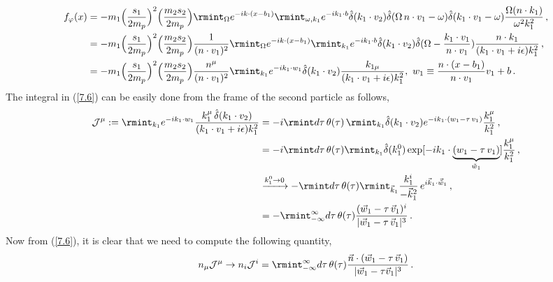 \begin{align}
\begin{split}
      f_{\varphi}(x)&= -m_1\Big(\frac{s_1}{2m_p}\Big)^2 \Big(\frac{m_2s_2}{2m_p}\Big)\rmint_{\Omega}e^{-ik\cdot (x-b_1)}\rmint_{\omega,k_1}e^{-i k_1\cdot b}\hat{\delta}(k_1\cdot v_2)\hat{\delta}(\Omega\, n\cdot v_1-\omega)\hat\delta(k_1\cdot v_1-\omega)\frac{\Omega(n\cdot k_1)}{\omega^2 k_1^2}\,,\\ &
       = -m_1\Big(\frac{s_1}{2m_p}\Big)^2 \Big(\frac{m_2s_2}{2m_p}\Big)\frac{1}{(n\cdot v_1)^2}\rmint_{\Omega}e^{-ik\cdot (x-b_1)}\rmint_{k_1}e^{-ik_1\cdot b}\hat\delta(k_1\cdot v_2)\hat{\delta}(\Omega-\frac{k_1\cdot v_1}{n\cdot v_1})\frac{n\cdot k_1}{(k_1\cdot v_1+i\epsilon)k_1^2}\,,\\ &
     = -m_1\Big(\frac{s_1}{2m_p}\Big)^2 \Big(\frac{m_2s_2}{2m_p}\Big)\frac{n^{\mu}}{(n\cdot v_1)^2}\rmint_{k_1}e^{-i k_1\cdot w_1}\hat{\delta}(k_1\cdot v_2)\frac{k_{1\mu}}{(k_1\cdot v_1+i\epsilon)k_1^2},\,\, w_1\equiv\frac{n\cdot (x-b_1)}{n\cdot v_1}v_1+b \,.\label{7.6}
      \end{split}
\end{align}
The integral in (\ref{7.6}) can be easily done from the frame of the second particle as follows,
\begin{align}
    \begin{split}
        \mathcal{J}^{\mu}:=\rmint_{k_1}e^{-i k_1\cdot w_1}\frac{k_1^{\mu}\,\hat\delta(k_1\cdot v_2)}{(k_1\cdot v_1+i\epsilon)k_1^2}&=-i\rmint d\tau \,\theta(\tau)\,\rmint_{k_1}\hat{\delta}(k_1\cdot v_2) e^{-ik_1\cdot (w_1-\tau\, v_1)}\frac{k_1^{\mu}}{k_1^2}\,,\\ &
        =-i\rmint d\tau\,\theta(\tau)\rmint_{k_1}\hat\delta{(k_1^{0})} \exp[{-ik_1\cdot \underbrace{(w_1-\tau\, v_1)}_{\tilde{w}_1}}]\frac{k_1^{\mu}}{k_1^2}\,,\\ &
        \xrightarrow[]{k_1^0\rightarrow 0}-\rmint d\tau\, \theta(\tau)\rmint_{\vec k_1}\frac{k_1^i}{-\vec k_1^2}\,e^{i \vec{k}_1\cdot \vec {\tilde w}_1}\,,\\ &
        =-\rmint_{-\infty}^{\infty}d\tau \, \theta(\tau)\frac{(\vec w_1-\tau\,\vec v_1)^{i}}{|\vec w_1-\tau\,\vec v_1|^{3}}\,.
    \end{split}
\end{align}
Now from (\ref{7.6}), it is clear that we need to compute the following quantity,
\begin{align}
    \begin{split}
        n_{\mu}\mathcal{J}^{\mu}\rightarrow n_{i}\mathcal{J}^{i}=\rmint_{-\infty}^{\infty}d\tau\, \theta(\tau)\frac{\vec n\cdot (\vec w_1-\tau\, \vec v_1)}{|\vec w_1-\tau \vec v_1|^3}\,.
    \end{split}
\end{align}
